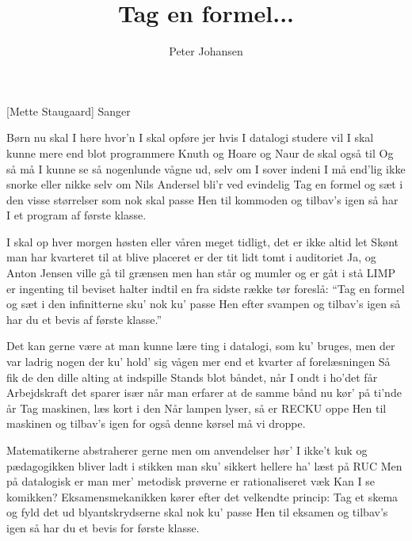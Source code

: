 \documentclass[a4paper,11pt]{article}
\title{Tag en formel...}
\author{Peter Johansen}
\begin{document}
\maketitle

\begin{roles}
[Mette Staugaard] Sanger
\end{roles}

\begin{song}
Børn nu skal I høre
hvor'n I skal opføre
jer hvis I datalogi studere vil
I skal kunne mere
end blot programmere
Knuth og Hoare og Naur de skal også til
Og så må I kunne
se så nogenlunde
vågne ud, selv om I sover indeni
I må end'lig ikke
snorke eller nikke
selv om Nils Andersel bli'r ved evindelig
Tag en formel og sæt i den
visse størrelser som nok skal passe
Hen til kommoden og tilbav's igen
så har I et program af første klasse.

I skal op hver morgen
høsten eller våren
meget tidligt, det er ikke altid let
Skønt man har kvarteret
til at blive placeret
er der tit lidt tomt i auditoriet
Ja, og Anton Jensen
ville gå til grænsen
men han står og mumler og er gåt i stå
LIMP er ingenting til
beviset halter indtil
en fra sidste række tør foreslå:
"`Tag en formel og sæt i den
infinitterne sku' nok ku' passe
Hen efter svampen og tilbav's igen
så har du et bevis af første klasse."'

Det kan gerne være
at man kunne lære
ting i datalogi, som ku' bruges, men
der var ladrig nogen
der ku' hold' sig vågen
mer end et kvarter af forelæsningen
Så fik de den dille
alting at indspille
Stands blot båndet, når I ondt i ho'det får
Arbejdskraft det sparer
især når man erfarer
at de samme bånd nu kør' på ti'nde år
Tag maskinen, læs kort i den
Når lampen lyser, så er RECKU oppe
Hen til maskinen og tilbav's igen
for også denne kørsel må vi droppe.

Matematikerne
abstraherer gerne
men om anvendelser hør' I ikke't kuk
og pædagogikken
bliver ladt i stikken
man sku' sikkert hellere ha' læst på RUC
Men på datalogisk
er man mer' metodisk
prøverne er rationaliseret væk
Kan I se komikken?
Eksamensmekanikken
kører efter det velkendte princip:
Tag et skema og fyld det ud
blyantskrydserne skal nok ku' passe
Hen til eksamen og tilbav's igen
så har du et bevis for første klasse.
\end{song}
\end{document}
